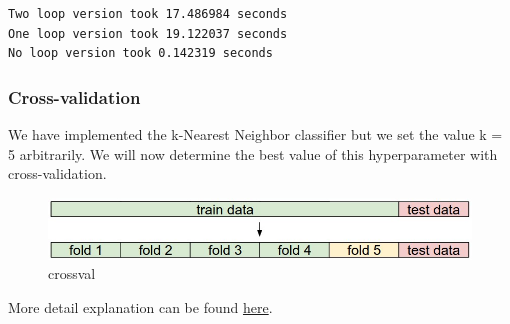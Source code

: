 \documentclass[11pt]{article}
\makeatletter
\def\maxwidth{\ifdim\Gin@nat@width>\linewidth\linewidth
    \else\Gin@nat@width\fi}
\let\Oldincludegraphics\includegraphics
\renewcommand{\includegraphics}[1]{\Oldincludegraphics[width=.8\maxwidth]{#1}}
\makeatother
\begin{document}
    \begin{Verbatim}[commandchars=\\\{\}]
Two loop version took 17.486984 seconds
One loop version took 19.122037 seconds
No loop version took 0.142319 seconds

    \end{Verbatim}

    \hypertarget{cross-validation}{%
\subsubsection{Cross-validation}\label{cross-validation}}

We have implemented the k-Nearest Neighbor classifier but we set the
value k = 5 arbitrarily. We will now determine the best value of this
hyperparameter with cross-validation.

\begin{figure}
\centering
\includegraphics{imgs/crossval.jpeg}
\caption{crossval}
\end{figure}

More detail explanation can be found
\href{http://cs231n.github.io/classification/}{here}.
\end{document}
